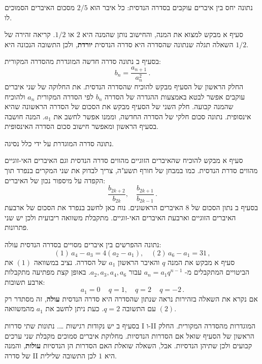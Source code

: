 \documentclass[12pt,a4paper]{article}
\begin{document}
\bigskip

\textbf{}
נתונה יחס בין איברים עוקבים בסדרה הנדסית: כל איבר הוא
$2/5$
מסכום האיברים הסמוכים לו.

סעיף א מבקש למצוא את המנה, והחישוב נותן שהמנה היא
$2$
או
$1/2$.
קריאה זהירה של השאלה תגלה שנתונה שהסדרה היא סדרה הנדסית
\textbf{יורדת}, 
ולכן התשובה הנכונה היא 
$1/2$.

בסעיף ב נתונה סדרה חדשה המוגדרת מהסדרה המקורית:
\[
b_n = \frac{a_{n+1}}{a_n^2}\,.
\]
החלק הראשון של הסעיף מבקש להוכיח שהסדרה הנדסית. את החלוקה של שני איברים עוקבים אפשר לבטא באמצעות ההגדרה של הסדרה
$b_n$
לפי הסדרה המקורית
$a_n$
ולהוכיח שהמנה קבועה. חלק השני של הסעיף מבקש את הסכום של הסדרה הראשונה שהיא אינסופית. נתונה סכום חלקי של הסדרה החדשה, וממנו אפשר לחשב את
$a_1$.
המנה חושבה בסעיף הראשון ומאפשר חישוב סכום הסדרה האינסופית.


\bigskip

\textbf{}
נתונה סדרה המוגדרת על ידי כלל נסיגה.

סעיף א מבקש להוכיח שהאיברים הזוגיים מהווים סדרה הנדסית וגם האיברים האי-זוגיים מהווים סדרת הנדסית. כמו במבחן של חורף תשע"ה, צריך לבדוק את שני המקרים בנפרד תוך הקפדה על מיספור נכון של האיברים:
\[
\frac{b_{2k+2}}{b_{2k}},\quad \frac{b_{2k+1}}{b_{2k-1}}\,.
\]
בסעיף ב נתון הסכום של 
$8$
האיברים הראשונים. נוח כאן לחשב בנפרד את הסכום של ארבעת האיברים הזוגיים וארבעת האיברים האי-זוגיים. מתקבלת משוואה ריבועית ולכן יש שני פתרונות.


\bigskip

\textbf{}
נתונה ההפרשים בין איברים מסויים בסדרה הנדסית עולה:
\[
(1)\, a_4-a_3 = 4 (a_2-a_1),\quad (2)\, a_6 - a_1 = 31\,,
\]
סעיף א מבקש את המנה
$q$
והאיבר הראשון
$a_1$
של הסדרה. נציב במשוואה
$(1)$
 את הביטויים המתקבלים מ-%
$a_n=a_1q^{n-1}$
עבור
$a_2, a_3, a_4, a_6$.
באופן קצת מפתיעה מתקבלות ארבע תשובות:
\[
a_1 = 0\,\quad q=1,\quad q=2\, \quad q=-2\,.
\]
אם נקרא את השאלה בזהירות נראה שנתון שהסדרה היא סדרה הנדסית
\textbf{עולה},
זה מסתדר רק עם התשובה
$q=2$.
כעת ניתן לחשב את
$a_1$
מהמשוואה
$(2)$.

בסעיף ב יש נקודות רגישות
\ldots.
נתונות שתי סדרות I ו-II המוגדרות מהסדרה המקורית. החלק הראשון של הסעיף שואל אם הסדרות הנדסיות. מחלוקת איברים סמוכים מקבלת שני ערכים קבועים ולכן שתיהן הנדסיות. אבל, השאלה שואלת האם הסדרות הן הנדסיות 
\textbf{עולות},
והמנה של סדרה II היא
$1$
לכן התשובה שלילית.
\end{document}
